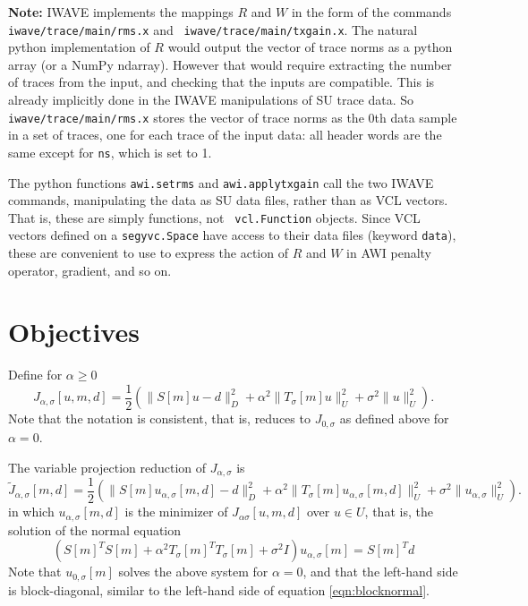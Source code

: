 {\bf Note:} IWAVE implements the mappings $R$ and $W$ in the form of
the commands {\tt iwave/trace/main/rms.x} and {\tt
  iwave/trace/main/txgain.x}. The natural python implementation of $R$
would output the vector of trace norms as a python array (or a NumPy
ndarray). However that would require extracting the number of traces
from the input, and checking that the inputs are compatible. This is
already implicitly done in the IWAVE manipulations of SU trace
data. So {\tt iwave/trace/main/rms.x} stores the vector of trace norms
as the 0th data sample in a set of traces, one for each trace of the
input data: all header words are the same except for {\tt ns}, which
is set to 1.

The python functions {\tt awi.setrms} and {\tt awi.applytxgain} call
the two IWAVE commands, manipulating the data as SU data files, rather
than as VCL vectors. That is, these are simply functions, not {\tt
  vcl.Function} objects. Since VCL vectors defined on a {\tt segyvc.Space}
have access to their data files (keyword {\tt data}), these are
convenient to use to express the action of $R$ and $W$ in AWI penalty operator,
gradient, and so on.

\section{Objectives}
Define for $\alpha \ge 0$
\[
 J_{\alpha,\sigma}[u,m,d] = \frac{1}{2}(\|S[m]u - d\|_D^2 + \alpha^2\|T_\sigma[m]u\|_U^2 + \sigma^2 \|u\|^2_U).
\]
Note that the notation is consistent, that is, reduces to $J_{0,\sigma}$ as defined above for $\alpha=0$.

The variable projection reduction of $J_{\alpha,\sigma}$ is
\begin{equation}
  \label{eqn:jtilde}
 \tilde{J}_{\alpha,\sigma}[m,d] = \frac{1}{2}(\|S[m]u_{\alpha,\sigma}[m,d] - d\|_D^2 + \alpha^2\|T_{\sigma}[m]u_{\alpha,\sigma}[m,d]\|_U^2 + \sigma^2 \|u_{\alpha,\sigma}\|^2_U).
\end{equation}
in which $u_{\alpha,\sigma}[m,d]$ is the minimizer of $J_{\alpha\sigma}[u,m,d]$ over $u \in U$, that is, the solution of the normal equation
\begin{equation}
  \label{eqn:normal}
  (S[m]^TS[m] + \alpha^2T_{\sigma}[m]^TT_{\sigma}[m] + \sigma^2I)u_{\alpha,\sigma}[m] = S[m]^Td
\end{equation}
Note that $u_{0,\sigma}[m]$ solves the above system for $\alpha=0$, and that the left-hand side is block-diagonal, similar to the left-hand side of equation \ref{eqn:blocknormal}.

